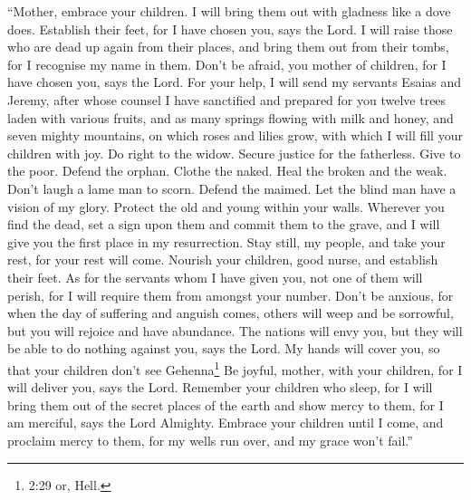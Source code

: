  ``Mother, embrace your children. I will bring them out
with gladness like a dove does. Establish their feet, for I have chosen
you, says the Lord.  I will raise those who are dead up
again from their places, and bring them out from their tombs, for I
recognise my name in them.  Don't be afraid, you mother of
children, for I have chosen you, says the Lord.  For your
help, I will send my servants Esaias and Jeremy, after whose counsel I
have sanctified and prepared for you twelve trees laden with various
fruits,  and as many springs flowing with milk and honey,
and seven mighty mountains, on which roses and lilies grow, with which I
will fill your children with joy.  Do right to the widow.
Secure justice for the fatherless. Give to the poor. Defend the orphan.
Clothe the naked.  Heal the broken and the weak. Don't
laugh a lame man to scorn. Defend the maimed. Let the blind man have a
vision of my glory.  Protect the old and young within your
walls.  Wherever you find the dead, set a sign upon them
and commit them to the grave, and I will give you the first place in my
resurrection.  Stay still, my people, and take your rest,
for your rest will come.  Nourish your children, good
nurse, and establish their feet.  As for the servants whom
I have given you, not one of them will perish, for I will require them
from amongst your number.  Don't be anxious, for when the
day of suffering and anguish comes, others will weep and be sorrowful,
but you will rejoice and have abundance.  The nations will
envy you, but they will be able to do nothing against you, says the
Lord.  My hands will cover you, so that your children don't
see Gehenna\footnote{2:29 or, Hell.}  Be joyful, mother,
with your children, for I will deliver you, says the Lord. 
Remember your children who sleep, for I will bring them out of the
secret places of the earth and show mercy to them, for I am merciful,
says the Lord Almighty.  Embrace your children until I
come, and proclaim mercy to them, for my wells run over, and my grace
won't fail.''

